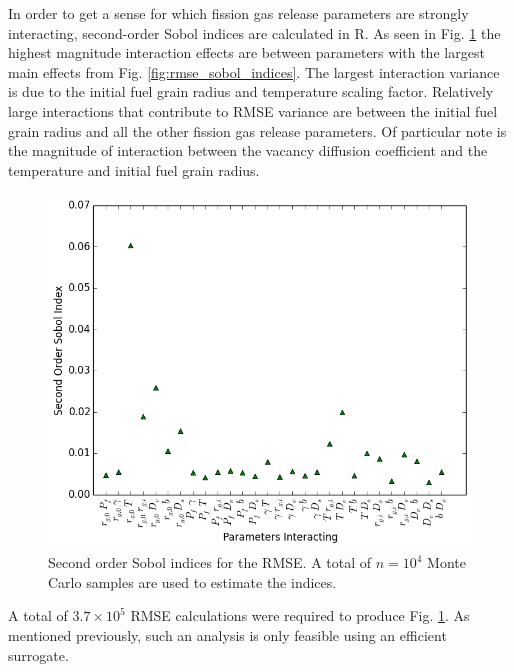 In order to get a sense for which fission gas release parameters are strongly interacting, second-order Sobol indices are calculated in R. As seen in Fig. \ref{fig:rmse_sobol_indices_2nd_order} the highest magnitude interaction effects are between parameters with the largest main effects from Fig. \ref{fig:rmse_sobol_indices}. The largest interaction variance is due to the initial fuel grain radius and temperature scaling factor. Relatively large interactions that contribute to \ac{RMSE} variance are between the initial fuel grain radius and all the other fission gas release parameters. Of particular note is the magnitude of interaction between the vacancy diffusion coefficient and the temperature and initial fuel grain radius.     
\begin{figure}[!h]
\caption{\label{fig:rmse_sobol_indices_2nd_order}
Second order Sobol indices for the \ac{RMSE}. A total of $n=10^4$ Monte Carlo samples are used to estimate the indices.}
 \begin{center}
  \includegraphics[scale=.75]{./Chapter4/sobol_2nd_order.png}
 \end{center}
\end{figure}
A total of $3.7\times 10^5$ \ac{RMSE} calculations were required to produce Fig. \ref{fig:rmse_sobol_indices_2nd_order}. As mentioned previously, such an analysis is only feasible using an efficient surrogate.



   



    






   

